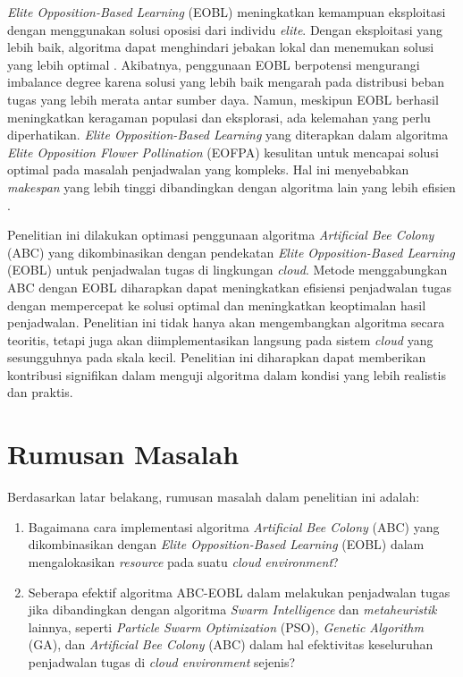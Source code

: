 \textit{Elite Opposition-Based Learning} (EOBL) meningkatkan kemampuan eksploitasi dengan menggunakan solusi oposisi dari individu \textit{elite}. Dengan eksploitasi yang lebih baik, algoritma dapat menghindari jebakan lokal dan menemukan solusi yang lebih optimal \parencite{Guo2015}. Akibatnya, penggunaan EOBL berpotensi mengurangi imbalance degree karena solusi yang lebih baik mengarah pada distribusi beban tugas yang lebih merata antar sumber daya. Namun, meskipun EOBL berhasil meningkatkan keragaman populasi dan eksplorasi, ada kelemahan yang perlu diperhatikan. \textit{Elite Opposition-Based Learning} yang diterapkan dalam algoritma \textit{Elite Opposition Flower Pollination} (EOFPA) kesulitan untuk mencapai solusi optimal pada masalah penjadwalan yang kompleks. Hal ini menyebabkan \textit{makespan} yang lebih tinggi dibandingkan dengan algoritma lain yang lebih efisien \parencite{Zhou2016}.

Penelitian ini dilakukan optimasi penggunaan algoritma \textit{Artificial Bee Colony} (ABC) yang dikombinasikan dengan pendekatan \textit{Elite Opposition-Based Learning} (EOBL) untuk penjadwalan tugas di lingkungan \textit{cloud}. Metode menggabungkan ABC dengan EOBL diharapkan dapat meningkatkan efisiensi penjadwalan tugas dengan mempercepat ke solusi optimal dan meningkatkan keoptimalan hasil penjadwalan. Penelitian ini tidak hanya akan mengembangkan algoritma secara teoritis, tetapi juga akan diimplementasikan langsung pada sistem \textit{cloud} yang sesungguhnya pada skala kecil. Penelitian ini diharapkan dapat memberikan kontribusi signifikan dalam menguji algoritma dalam kondisi yang lebih realistis dan praktis.

\section{Rumusan Masalah}
Berdasarkan latar belakang, rumusan masalah dalam penelitian ini adalah:
\begin{enumerate} [nolistsep]
    \item Bagaimana cara implementasi algoritma \textit{Artificial Bee Colony} (ABC) yang dikombinasikan dengan \textit{Elite Opposition-Based Learning} (EOBL) dalam mengalokasikan \textit{resource} pada suatu \textit{cloud environment}?
    \item Seberapa efektif algoritma ABC-EOBL dalam melakukan penjadwalan tugas jika dibandingkan dengan algoritma \textit{Swarm Intelligence} dan \textit{metaheuristik} lainnya, seperti \textit{Particle Swarm Optimization} (PSO), \textit{Genetic Algorithm} (GA), dan \textit{Artificial Bee Colony} (ABC) dalam hal efektivitas keseluruhan penjadwalan tugas di \textit{cloud environment} sejenis?
\end{enumerate}

